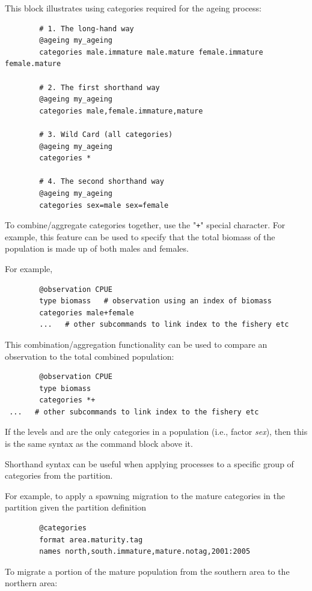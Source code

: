 \ifAgeBased
This block illustrates using categories required for the ageing process:

{\small{\begin{verbatim}
		# 1. The long-hand way
		@ageing my_ageing
		categories male.immature male.mature female.immature female.mature

		# 2. The first shorthand way
		@ageing my_ageing
		categories male,female.immature,mature

		# 3. Wild Card (all categories)
		@ageing my_ageing
		categories *

		# 4. The second shorthand way
		@ageing my_ageing
		categories sex=male sex=female
\end{verbatim}}}
\fi
To combine/aggregate categories together, use the "\texttt{+}" special character. For example, this feature can be used to specify that the total biomass of the population is made up of both males and females.

For example,

{\small{\begin{verbatim}
		@observation CPUE
		type biomass   # observation using an index of biomass
		categories male+female
        ...   # other subcommands to link index to the fishery etc
\end{verbatim}}}

This combination/aggregation functionality can be used to compare an observation to the total combined population:

{\small{\begin{verbatim}
		@observation CPUE
		type biomass
		categories *+
 ...   # other subcommands to link index to the fishery etc
		\end{verbatim}}}

If the levels  and  are the only categories in a population (i.e., factor \textit{sex}), then this is the same syntax as the command block above it.

Shorthand syntax can be useful when applying processes to a specific group of categories from the partition.

For example, to apply a spawning migration to the mature categories in the partition given the partition definition

{\small{\begin{verbatim}
		@categories
		format area.maturity.tag
		names north,south.immature,mature.notag,2001:2005
\end{verbatim}}}

To migrate a portion of the mature population from the southern area to the northern area:

